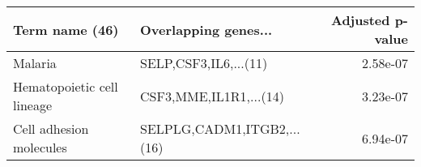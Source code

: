 \begin{tabular}{llr}
\toprule
            Term name (46) &       Overlapping genes... &  Adjusted p-value \\
\midrule
                   Malaria &      SELP,CSF3,IL6,...(11) &          2.58e-07 \\
Hematopoietic cell lineage &     CSF3,MME,IL1R1,...(14) &          3.23e-07 \\
   Cell adhesion molecules & SELPLG,CADM1,ITGB2,...(16) &          6.94e-07 \\
\bottomrule
\end{tabular}
